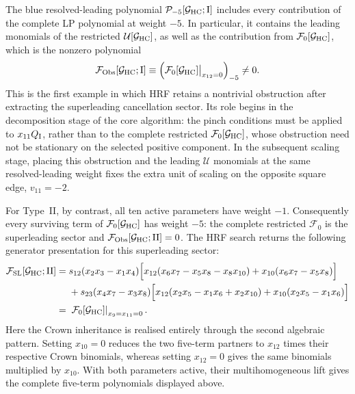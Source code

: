 \documentclass[a4paper,11pt]{article}
\begin{document}
The blue resolved-leading polynomial
\(\mathcal P_{-5}[\mathcal G_{\rm HC};{\rm I}]\) includes every contribution
of the complete LP polynomial at weight \(-5\).  In particular, it contains
the leading monomials of the restricted \(\mathcal U[\mathcal G_{\rm HC}]\),
as well as the contribution from \(\mathcal F_0[\mathcal G_{\rm HC}]\), which
is the nonzero polynomial
\[
 \mathcal F_{\rm Obs}[\mathcal G_{\rm HC};{\rm I}]
 \equiv
 \Bigl(\mathcal F_0[\mathcal G_{\rm HC}]
 \big|_{x_{12}=0}\Bigr)_{-5}\ne0.
\]
This is the first example in which HRF retains a nontrivial obstruction after
extracting the superleading cancellation sector.  Its role begins in the
decomposition stage of the core algorithm: the pinch conditions must be
applied to \(x_{11}Q_{\rm I}\), rather than to the complete restricted
\(\mathcal F_0[\mathcal G_{\rm HC}]\), whose obstruction need not be
stationary on the selected positive component.  In the subsequent scaling
stage, placing this obstruction and the leading \(\mathcal U\) monomials at
the same resolved-leading weight fixes the extra unit of scaling on the
opposite square edge, \(v_{11}=-2\).

For Type~II, by contrast, all ten active parameters have weight \(-1\).
Consequently every surviving term of
\(\mathcal F_0[\mathcal G_{\rm HC}]\) has weight \(-5\): the complete
restricted \(\mathcal F_0\) is the superleading sector and
\(\mathcal F_{\rm Obs}[\mathcal G_{\rm HC};{\rm II}]=0\).  The HRF search
returns the following generator presentation for this superleading sector:
\begin{equation}
\begin{aligned}
 \mathcal F_{\rm SL}[\mathcal G_{\rm HC};{\rm II}]
={}&s_{12}(x_2x_3-x_1x_4)
 \Bigl[x_{12}(x_6x_7-x_5x_8-x_8x_{10})
       +x_{10}(x_6x_7-x_5x_8)\Bigr]\\
 &+s_{23}(x_4x_7-x_3x_8)
 \Bigl[x_{12}(x_2x_5-x_1x_6+x_2x_{10})
       +x_{10}(x_2x_5-x_1x_6)\Bigr]\\
={}&\left.\mathcal F_0[\mathcal G_{\rm HC}]
\right|_{x_9=x_{11}=0}.
\end{aligned}
\label{eq:HC-type-II-generators}
\end{equation}
Here the Crown inheritance is realised entirely through the second algebraic
pattern.  Setting \(x_{10}=0\) reduces the two five-term partners to
\(x_{12}\) times their respective Crown binomials, whereas setting
\(x_{12}=0\) gives the same binomials multiplied by \(x_{10}\).  With both
parameters active, their multihomogeneous lift gives the complete five-term
polynomials displayed above.
\end{document}

